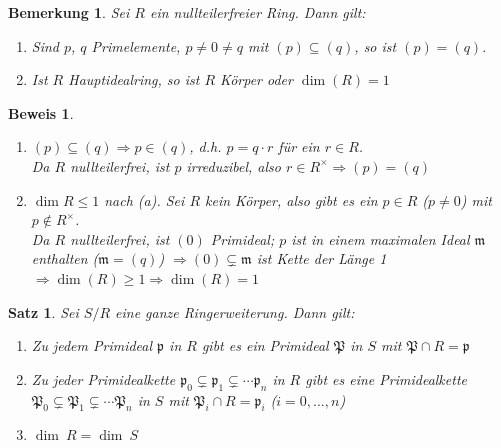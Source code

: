 \documentclass[a4paper,12pt]{scrbook}
\theoremstyle{break}
\newtheorem{Satz}{Satz}
\newtheorem{Bem}[Def]{Bemerkung}
\theoremstyle{nonumberbreak}
\newtheorem{Bew}{Beweis}
\theoremstyle{nonumberplain}
\begin{document}
\begin{Bem}
\label{2.25}
Sei $R$ ein nullteilerfreier Ring. Dann gilt: 
\begin{enumerate}
\item Sind $p$, $q$ Primelemente, $p\neq 0\neq q$ mit $(p)\subseteq (q)$, so ist $(p)=(q)$.
\item Ist $R$ Hauptidealring, so ist $R$ Körper oder $\dim(R)=1$
\end{enumerate}
\end{Bem}
\begin{Bew}
\begin{enumerate}

\item $(p)\subseteq (q)\Rightarrow p\in(q)$, d.h. $p=q\cdot r$ für ein $r\in R$.\\
Da $R$ nullteilerfrei, ist $p$ irreduzibel, also $r\in R^{\times}\Rightarrow (p)=(q)$

\item $\dim R\leq 1$ nach (a). Sei $R$ kein Körper, also gibt es ein $p\in R$
($p\neq 0$) mit $p\notin R^{\times}$.\\
Da $R$ nullteilerfrei, ist $(0)$ Primideal; $p$ ist in einem maximalen Ideal $\mathfrak{m}$ enthalten ($\mathfrak{m}=(q)$)
$\Rightarrow (0)\subsetneq \mathfrak{m}$ ist Kette der Länge 1
$\Rightarrow \dim(R)\geq 1 \Rightarrow \dim(R)=1$

\end{enumerate}
\end{Bew}

\begin{Satz}
\label{Satz10}
Sei $S/R$ eine ganze Ringerweiterung. Dann gilt:
\begin{enumerate}

\item Zu jedem Primideal $\mathfrak{p}$ in $R$ gibt es ein Primideal $\mathfrak{P}$ in $S$
mit $\mathfrak{P}\cap R=\mathfrak{p}$

\item Zu jeder Primidealkette $\mathfrak{p}_0\subsetneq \mathfrak{p}_1\subsetneq \cdots
\mathfrak{p}_n$ in $R$ gibt es eine Primidealkette 
$\mathfrak{P}_0\subsetneq \mathfrak{P}_1\subsetneq \cdots \mathfrak{P}_n$ in $S$
mit $\mathfrak{P}_i\cap R=\mathfrak{p}_i$ ($i=0,\ldots, n$)

\item \label{Satz10c}$\dim\ R= \dim\ S$

\end{enumerate}
\end{Satz}
\end{document}
